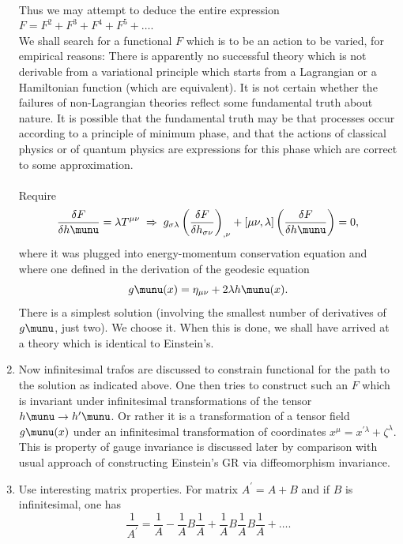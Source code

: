 \begin{enumerate}
\\ 
Thus we may attempt to deduce the entire expression $F=F^2+F^3+F^4+F^5+\dots$.\\
We shall search for a functional $F$ which is to be an action to be varied, for empirical reasons: There is apparently no successful theory which is not derivable from a variational principle which starts from a Lagrangian or a Hamiltonian function (which are equivalent). It is not certain whether the failures of non-Lagrangian theories reflect some fundamental truth about nature. It is possible that the fundamental truth may be that processes occur according to a principle of minimum phase, and that the actions of classical physics or of quantum physics are expressions for this phase which are correct to some approximation.\\
\\
Require
\begin{equation}
	\frac{\delta F}{\delta h\munu} = \lambda T^{\mu \nu} \; \Rightarrow \; g_{\sigma \lambda} \left(\frac{\delta F}{\delta h_{\sigma \nu}}\right)_{, \nu} + [\mu \nu,\lambda] \left(\frac{\delta F}{\delta h\munu}\right) = 0,
\end{equation}
where it was plugged into energy-momentum conservation equation and where one defined in the derivation of the geodesic equation 
\begin{equation}
	g\munu(x)=\eta_{\mu \nu} + 2 \lambda h\munu(x).
\end{equation}
There is a simplest solution (involving the smallest number of derivatives of $g\munu$, just two). We choose it. When this is done, we shall have arrived at a theory which is identical to Einstein's.
\item Now infinitesimal trafos are discussed to constrain functional for the path to the solution as indicated above. One then tries to construct such an $F$ which is invariant under infinitesimal transformations of the tensor $h\munu \rightarrow h^\prime\munu$. Or rather it is a transformation of a tensor field $g\munu(x)$ under an infinitesimal transformation of coordinates $x^\mu = x^{\prime \lambda} + \zeta^\lambda$. This is property of gauge invariance is discussed later by comparison with usual approach of constructing Einstein's GR via diffeomorphism invariance.
\item Use interesting matrix properties. For matrix $A^\prime = A+B$ and if $B$ is infinitesimal, one has
\begin{equation}
	\frac{1}{A^\prime} = \frac{1}{A} - \frac{1}{A }B \frac{1}{A} + \frac{1}{A} B \frac{1}{A} B \frac{1}{A }+\dots.

\end{equation}
\end{enumerate}
